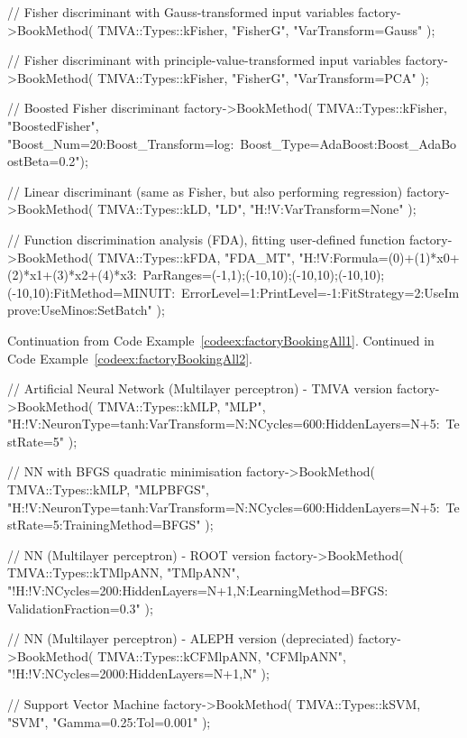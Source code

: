 \begin{appendix}
\begin{codeexample}
\begin{tmvacode}
// Fisher discriminant with Gauss-transformed input variables
factory->BookMethod( TMVA::Types::kFisher, "FisherG", "VarTransform=Gauss" );

// Fisher discriminant with principle-value-transformed input variables
factory->BookMethod( TMVA::Types::kFisher, "FisherG", "VarTransform=PCA" );

// Boosted Fisher discriminant
factory->BookMethod( TMVA::Types::kFisher, "BoostedFisher", 
    "Boost_Num=20:Boost_Transform=log:\
     Boost_Type=AdaBoost:Boost_AdaBoostBeta=0.2");

// Linear discriminant (same as Fisher, but also performing regression)
factory->BookMethod( TMVA::Types::kLD, "LD", "H:!V:VarTransform=None" );

// Function discrimination analysis (FDA), fitting user-defined function
factory->BookMethod( TMVA::Types::kFDA, "FDA_MT",
    "H:!V:Formula=(0)+(1)*x0+(2)*x1+(3)*x2+(4)*x3:\
     ParRanges=(-1,1);(-10,10);(-10,10);(-10,10);(-10,10):FitMethod=MINUIT:\
     ErrorLevel=1:PrintLevel=-1:FitStrategy=2:UseImprove:UseMinos:SetBatch" );
\end{tmvacode}
\caption[.]{\codeexampleCaptionSize Continuation from Code Example~\ref{codeex:factoryBookingAll1}.
            Continued in Code Example~\ref{codeex:factoryBookingAll2}.}
\label{codeex:factoryBookingAll2}
\end{codeexample}
\begin{codeexample}
\begin{tmvacode}
// Artificial Neural Network (Multilayer perceptron) - TMVA version
factory->BookMethod( TMVA::Types::kMLP, "MLP", 
    "H:!V:NeuronType=tanh:VarTransform=N:NCycles=600:HiddenLayers=N+5:\
     TestRate=5" );

// NN with BFGS quadratic minimisation
factory->BookMethod( TMVA::Types::kMLP, "MLPBFGS", 
    "H:!V:NeuronType=tanh:VarTransform=N:NCycles=600:HiddenLayers=N+5:\
     TestRate=5:TrainingMethod=BFGS" );

// NN (Multilayer perceptron) - ROOT version
factory->BookMethod( TMVA::Types::kTMlpANN, "TMlpANN", 
    "!H:!V:NCycles=200:HiddenLayers=N+1,N:LearningMethod=BFGS:
     ValidationFraction=0.3"  ); 

// NN (Multilayer perceptron) - ALEPH version (depreciated)
factory->BookMethod( TMVA::Types::kCFMlpANN, "CFMlpANN", 
    "!H:!V:NCycles=2000:HiddenLayers=N+1,N"  ); 

// Support Vector Machine
factory->BookMethod( TMVA::Types::kSVM, "SVM", "Gamma=0.25:Tol=0.001" );


\end{tmvacode}
\end{codeexample}
\end{appendix}
